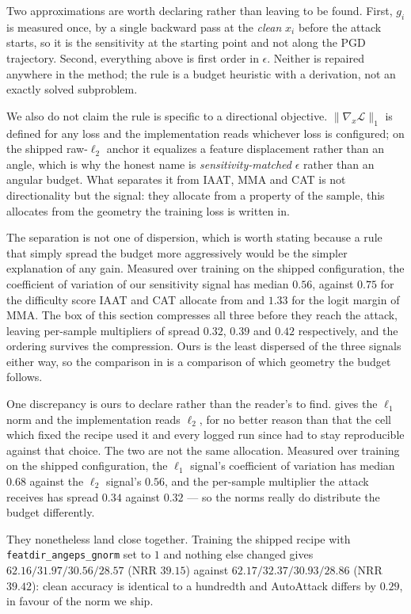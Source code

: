 Two approximations are worth declaring rather than leaving to be found. First, $g_i$ is measured once,
by a single backward pass at the \emph{clean} $x_i$ before the attack starts, so it is the sensitivity
at the starting point and not along the PGD trajectory. Second, everything above is first order in
$\epsilon$. Neither is repaired anywhere in the method; the rule is a budget heuristic with a
derivation, not an exactly solved subproblem.

We also do not claim the rule is specific to a directional objective. $\lVert\nabla_x\mathcal{L}\rVert_1$
is defined for any loss and the implementation reads whichever loss is configured; on the shipped
raw-$\ell_2$ anchor it equalizes a feature displacement rather than an angle, which is why the honest
name is \emph{sensitivity-matched} $\epsilon$ rather than an angular budget. What separates it from
IAAT, MMA and CAT is not directionality but the signal: they allocate from a property of the sample,
this allocates from the geometry the training loss is written in.

The separation is not one of dispersion, which is worth stating because a rule that simply spread the
budget more aggressively would be the simpler explanation of any gain. Measured over training on the
shipped configuration, the coefficient of variation of our sensitivity signal has median $0.56$,
against $0.75$ for the difficulty score IAAT and CAT allocate from and $1.33$ for the logit margin of
MMA. The box of this section compresses all three before they reach the attack, leaving per-sample
multipliers of spread $0.32$, $0.39$ and $0.42$ respectively, and the ordering survives the
compression. Ours is the least dispersed of the three signals either way, so the comparison in
 is a comparison of which geometry the budget follows.

One discrepancy is ours to declare rather than the reader's to find.  gives the
$\ell_1$ norm and the implementation reads $\ell_2$, for no better reason than that the cell which
fixed the recipe used it and every logged run since had to stay reproducible against that choice. The
two are not the same allocation.
Measured over training on the shipped configuration, the $\ell_1$ signal's coefficient of variation
has median $0.68$ against the $\ell_2$ signal's $0.56$, and the per-sample multiplier the attack
receives has spread $0.34$ against $0.32$ --- so the norms really do distribute the budget
differently.

They nonetheless land close together. Training the shipped recipe with
\texttt{featdir\_angeps\_gnorm} set to $1$ and nothing else changed gives $62.16 / 31.97 / 30.56 /
28.57$ (NRR $39.15$) against $62.17 / 32.37 / 30.93 / 28.86$ (NRR $39.42$): clean accuracy is
identical to a hundredth and AutoAttack differs by $0.29$, in favour of the norm we ship.

